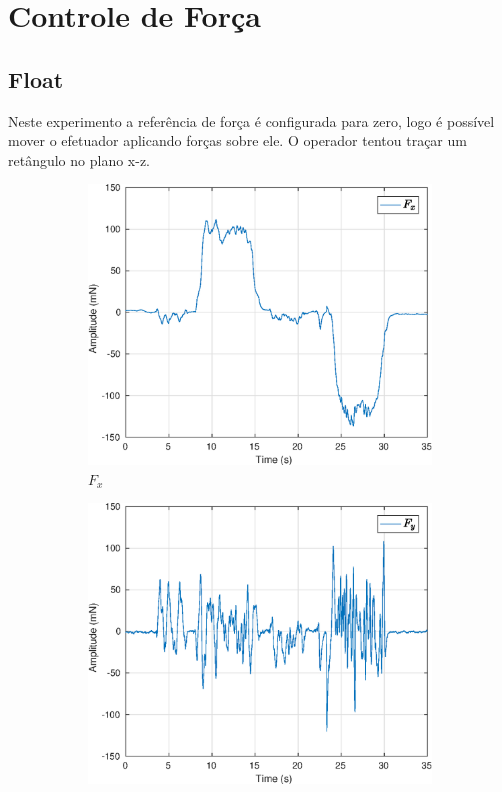 \section{Controle de Força}

\subsection{Float}
Neste experimento a referência de força é configurada para zero, logo é possível mover o efetuador aplicando forças sobre ele. O operador tentou traçar um retângulo no plano x-z.

\begin{figure}[H]
\centering
\begin{subfigure}{.5\textwidth}
  \centering
  \includegraphics[width=\linewidth]{./img/float2/Fx.eps}
  \caption{$F_x$}
  \label{fig:sub1}
\end{subfigure}%
\begin{subfigure}{.5\textwidth}
  \centering
  \includegraphics[width=\linewidth]{./img/float2/Fy.eps}

\end{subfigure}
\end{figure}
